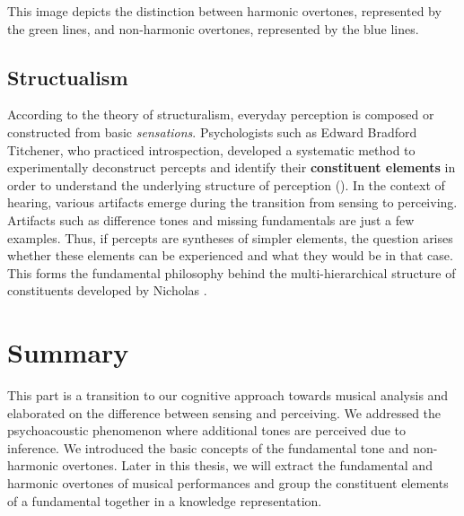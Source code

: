 \begin{marginfigure}
\centering

\vspace{0.1cm}
\caption{This image depicts the distinction between harmonic overtones, represented by the green lines, and non-harmonic overtones, represented by the blue lines.}
\label{nonharmonicMusic} 
\vspace{0.5cm}
\end{marginfigure}


\subsection{Structualism}
\label{subsec:structualism}
According to the theory of structuralism, everyday perception is composed or constructed from basic \textit{sensations}. Psychologists such as Edward Bradford Titchener, who practiced introspection, developed a systematic method to experimentally deconstruct percepts and identify their \textbf{constituent elements} in order to understand the underlying structure of perception (\cite{hatfield_objectifying_2015}).
In the context of hearing, various artifacts emerge during the transition from sensing to perceiving. Artifacts such as difference tones and missing fundamentals are just a few examples. Thus, if percepts are syntheses of simpler elements, the question arises whether these elements can be experienced and what they would be in that case. This forms the fundamental philosophy behind the multi-hierarchical structure of constituents developed by Nicholas \textcite{harley_abstract_2020}.


\section{Summary}
This part is a transition to our cognitive approach towards musical analysis and elaborated on the difference between sensing and perceiving. We addressed the psychoacoustic phenomenon where additional tones are perceived due to inference. We introduced the basic concepts of the fundamental tone and non-harmonic overtones. Later in this thesis, we will extract the fundamental and harmonic overtones of musical performances and group the constituent elements of a fundamental together in a knowledge representation. 





